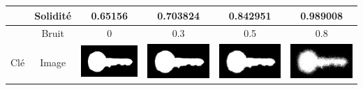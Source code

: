 \documentclass{article}
\theoremstyle{definition}
\begin{document}
\begin{table}[!h]
\begin{tabular}{|c|c|c|c|c|c|}
	    \cline{2-6}
	    & Solidité & 0.65156 & 0.703824 & 0.842951 & 0.989008 \\
	    \hline
	    \hline
	    & Bruit & 0 & 0.3 & 0.5 & 0.8 \\
	    \cline{2-6}
	    Clé & Image & \includegraphics[scale=0.15]{Illustrations/key-6.png} & \includegraphics[scale=0.15]{Illustrations/key-6(3).png} & \includegraphics[scale=0.15]{Illustrations/key-6(5).png} & \includegraphics[scale=0.15]{Illustrations/key-6(8).png} \\

\end{tabular}
\end{table}
\end{document}
